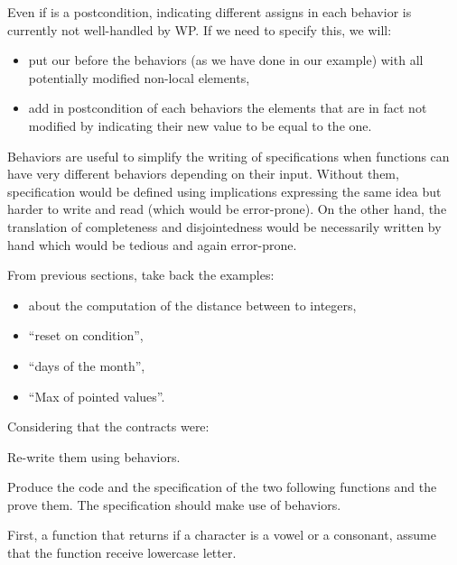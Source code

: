 \begin{Warning}
  Even if  is a postcondition, indicating different assigns
  in each behavior is currently not well-handled by WP. If we need to specify
  this, we will:
  \begin{itemize}
  \item put our  before the behaviors (as we have done in our
    example) with all potentially modified non-local elements,
  \item add in postcondition of each behaviors the elements that are in fact
    not modified by indicating their new value to be equal to the
     one.
  \end{itemize}
\end{Warning}


Behaviors are useful to simplify the writing of specifications when
functions can have very different behaviors depending on their input.
Without them, specification would be defined using implications
expressing the same idea but harder to write and read (which would be
error-prone). On the other hand, the translation of completeness and
disjointedness would be necessarily written by hand which would be
tedious and again error-prone.






From previous sections, take back the examples:


\begin{itemize}
\item about the computation of the distance between to integers,
\item ``reset on condition'',
\item ``days of the month'',
\item ``Max of pointed values''.
\end{itemize}


Considering that the contracts were:




Re-write them using behaviors.




Produce the code and the specification of the two following functions
and the prove them. The specification should make use of behaviors.


First, a function that returns if a character is a vowel or a consonant,
assume that the function receive lowercase letter.


